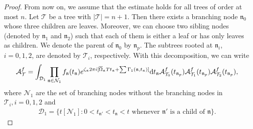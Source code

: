 \documentclass[UTF-8,reqno]{amsart}
\numberwithin{equation}{section}
\theoremstyle{definition}
\def\dif{{\mathord{{\rm d}}}}
\def\dif{{\mathord{{\rm d}}}}
\begin{document}
\begin{proof}
From now on, we assume that the estimate holds for all trees of order at most $n$.
Let $\mathcal{T}$ be a tree with $|\mathcal{T}|=n+1$. Then there exists a branching node $\mathfrak{n}_0$ whose three children are leaves. Moreover, we can choose two sibling nodes (denoted by $\mathfrak{n}_1$ and $\mathfrak{n}_2$) such that each of them is either a leaf or has only leaves as children. We denote the parent of $\mathfrak{n}_0$ by $\mathfrak{n}_p$. The subtrees rooted at $\mathfrak{n}_i$, $i=0,1,2$, are denoted by $\mathcal{T}_i$, respectively. With this decomposition, we can write
   \begin{align*}
       \mathcal{A}^f_{\mathcal{T}}=   \int_{\mathcal{D}_1}\prod_{\mathfrak{n}\in\mathcal{N}_1}  f_{\mathfrak{n}}(t_{\mathfrak{n}})e^{\zeta_\mathfrak{n}2\pi i[\overline\Omega_\mathfrak{n}Tt_\mathfrak{n}+\sum\Gamma_1(\mathfrak{n},t_\mathfrak{n})] } \dif t_\mathfrak{n}%
       \mathcal{A}^f_{\mathcal{T}_0}(t_{\mathfrak{n}_p})\mathcal{A}^f_{\mathcal{T}_1}(t_{\mathfrak{n}_p})\mathcal{A}^f_{\mathcal{T}_2}(t_{\mathfrak{n}_p}) ,
   \end{align*}
   where $\mathcal{N}_1$ are the set of branching nodes without the branching nodes in $\mathcal{T}_i,i=0,1,2$ and  \begin{align*}
\mathcal{D}_1 = \{t{[\mathcal{N}_1]} : 0 < t_{\mathfrak{n}'} < t_\mathfrak{n}<t  \text{ whenever } \mathfrak{n}' \text{ is a child of } \mathfrak{n} \}.
\end{align*}


\end{proof}
\end{document}
